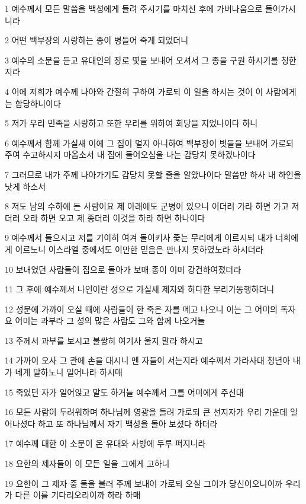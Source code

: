 \par 1 예수께서 모든 말씀을 백성에게 들려 주시기를 마치신 후에 가버나움으로 들어가시니라
\par 2 어떤 백부장의 사랑하는 종이 병들어 죽게 되었더니
\par 3 예수의 소문을 듣고 유대인의 장로 몇을 보내어 오셔서 그 종을 구원 하시기를 청한지라
\par 4 이에 저희가 예수께 나아와 간절히 구하여 가로되 이 일을 하시는 것이 이 사람에게는 합당하니이다
\par 5 저가 우리 민족을 사랑하고 또한 우리를 위하여 회당을 지었나이다 하니
\par 6 예수께서 함께 가실새 이에 그 집이 멀지 아니하여 백부장이 벗들을 보내어 가로되 주여 수고하시지 마옵소서 내 집에 들어오심을 나는 감당치 못하겠나이다
\par 7 그러므로 내가 주께 나아가기도 감당치 못할 줄을 알았나이다 말씀만 하사 내 하인을 낫게 하소서
\par 8 저도 남의 수하에 든 사람이요 제 아래에도 군병이 있으니 이더러 가라 하면 가고 저더러 오라 하면 오고 제 종더러 이것을 하라 하면 하나이다
\par 9 예수께서 들으시고 저를 기이히 여겨 돌이키사 좇는 무리에게 이르시되 내가 너희에게 이르노니 이스라엘 중에서도 이만한 믿음은 만나지 못하였노라 하시더라
\par 10 보내었던 사람들이 집으로 돌아가 보매 종이 이미 강건하여졌더라
\par 11 그 후에 예수께서 나인이란 성으로 가실새 제자와 허다한 무리가동행하더니
\par 12 성문에 가까이 오실 때에 사람들이 한 죽은 자를 메고 나오니 이는 그 어미의 독자요 어미는 과부라 그 성의 많은 사람도 그와 함께 나오거늘
\par 13 주께서 과부를 보시고 불쌍히 여기사 울지 말라 하시고
\par 14 가까이 오사 그 관에 손을 대시니 멘 자들이 서는지라 예수께서 가라사대 청년아 내가 네게 말하노니 일어나라 하시매
\par 15 죽었던 자가 일어앉고 말도 하거늘 예수께서 그를 어미에게 주신대
\par 16 모든 사람이 두려워하며 하나님께 영광을 돌려 가로되 큰 선지자가 우리 가운데 일어나셨다 하고 또 하나님께서 자기 백성을 돌아 보셨다 하더라
\par 17 예수께 대한 이 소문이 온 유대와 사방에 두루 퍼지니라
\par 18 요한의 제자들이 이 모든 일을 그에게 고하니
\par 19 요한이 그 제자 중 둘을 불러 주께 보내어 가로되 오실 그이가 당신이오니이까 우리가 다른 이를 기다리오리이까 하라 하매
